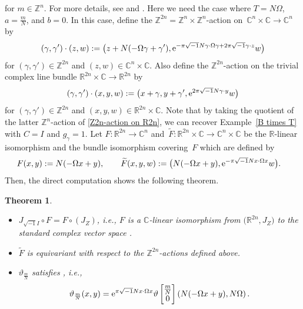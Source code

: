 \documentclass[10pt,a4paper]{amsart}
\numberwithin{equation}{section}
\newtheorem{Theorem}{Theorem}[section]
\newcommand{\C}{\mathbb{C}}
\newcommand{\R}{\mathbb{R}}
\newcommand{\Z}{\mathbb{Z}}
\renewcommand{\tilde}{\widetilde}
\begin{document}
for $m\in \Z^n$. For more details, see \cite[Chapter II, Section~1]{Mumford1} and \cite[Section~2]{Mumford3}.
%
Here we need the case where $T=N\Omega$, $a=\frac{m}{N}$, and $b=0$. In this case, define the $\Z^{2n}=\Z^n\times \Z^n$-action on~${\C^n\times \C\to \C^n}$ by
\begin{equation*}
(\gamma,\gamma')\cdot (z,w):=\bigl(z+N(-\Omega\gamma+\gamma'), {\rm e}^{-\pi\sqrt{-1}N\gamma \cdot \Omega\gamma +2\pi\sqrt{-1}\gamma \cdot z}w\bigr)
\end{equation*}
for $(\gamma,\gamma')\in \Z^{2n}$ and $(z,w)\in \C^n\times \C$. Also define the $\Z^{2n}$-action on the trivial complex line bundle $\R^{2n}\times \C\to \R^{2n}$ by
\begin{equation}\label{Z2n-action on R2n}
(\gamma,\gamma')\cdot (x,y,w):=\bigl(x+\gamma ,y+\gamma', {\rm e}^{2\pi\sqrt{-1}N\gamma\cdot y}w\bigr)
\end{equation}
for $(\gamma,\gamma')\in \Z^{2n}$ and $(x,y,w)\in \R^{2n}\times \C$. Note that by taking the quotient of the latter $\Z^n$-action of \eqref{Z2n-action on R2n}, we can recover Example~\ref{B times T} with $C=I$ and $g_\gamma=1$.
%
Let $F\colon \R^{2n}\to \C^n$ and~${{\tilde F}\colon \R^{2n}\times \C\to \C^n\times \C}$ be the $\R$-linear isomorphism and the bundle isomorphism covering~$F$ which are defined by
\begin{align*}
F(x,y)&:=N(-\Omega x+y) ,\qquad
{\tilde F}(x,y,w):=\bigl(N(-\Omega x+y) , {\rm e}^{-\pi\sqrt{-1}N x\cdot \Omega x}w\bigr) .
\end{align*}
Then, the direct computation shows the following theorem.
\begin{Theorem}\label{relation with theta}\quad
\begin{itemize}\itemsep=0pt
\item[$(1)$] $J_{\sqrt{-1}I}\circ F=F\circ (J_Z)$, i.e., $F$ is a $\C$-linear isomorphism from $\bigl(\R^{2n}, J_Z\bigr)$ to the standard complex vector space \smash{$(\C^n,J_{\sqrt{-1}I})$}.
\item[$(2)$] ${\tilde F}$ is equivariant with respect to the $\Z^{2n}$-actions defined above.
\item[$(3)$] $\vartheta_{\frac{m}{N}}$ satisfies \smash{${\tilde F}\circ \vartheta_{\frac{m}{N}}(x,y)=\vartheta
\left[
\begin{smallmatrix}
\frac{m}{N} \\
0
\end{smallmatrix}
\right]\left( F(x,y), N\Omega\right)$}, i.e.,
\[
\vartheta_{\frac{m}{N}}(x,y)={\rm e}^{\pi\sqrt{-1}N x\cdot \Omega x}\vartheta
\left[
\begin{matrix}
\frac{m}{N} \\
0
\end{matrix}
\right]\left( N(-\Omega x+y), N\Omega\right) .
\]
\end{itemize}
\end{Theorem}
\end{document}
